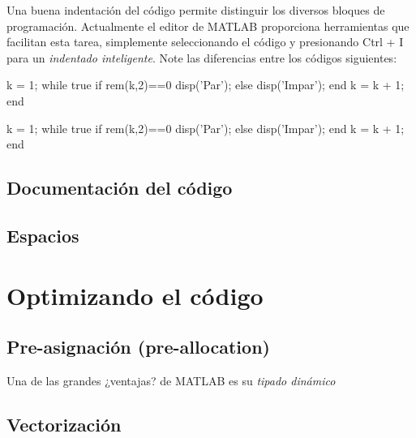 Una buena indentación del código permite distinguir los diversos bloques
de programación. Actualmente el editor de MATLAB proporciona
herramientas que facilitan esta tarea, simplemente seleccionando el
código y presionando Ctrl + I para un \emph{indentado inteligente}. Note
las diferencias entre los códigos siguientes:

\begin{matlab}
k = 1;
while true
if rem(k,2)==0
disp('Par');
else
disp('Impar');
end
k = k + 1;
end


k = 1;
while true
    if rem(k,2)==0
        disp('Par');
    else
        disp('Impar');
    end
    k = k + 1;
end
\end{matlab}

\subsection{Documentación del
código}\label{documentaciuxf3n-del-cuxf3digo}

\subsection{Espacios}\label{espacios}

\section{Optimizando el código}\label{optimizando-el-cuxf3digo}

\subsection{Pre-asignación
(pre-allocation)}\label{pre-asignaciuxf3n-pre-allocation}

Una de las grandes ¿ventajas? de MATLAB es su \emph{tipado dinámico}

\subsection{Vectorización}\label{vectorizaciuxf3n}
